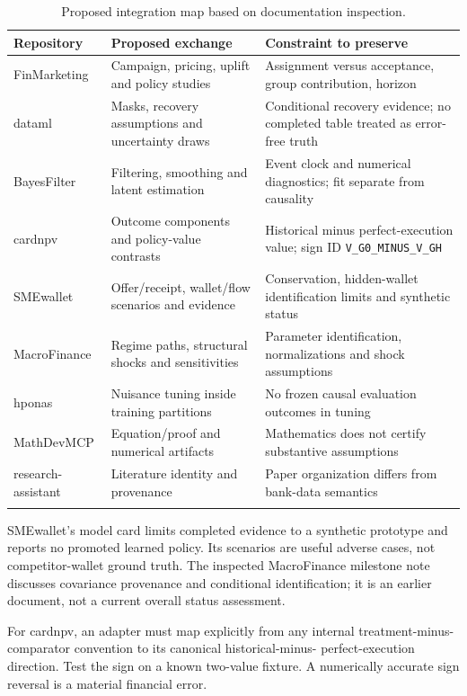 \begin{longtable}{P{24mm}P{50mm}P{68mm}}
\toprule Repository & Proposed exchange & Constraint to preserve\\\midrule
\endhead
FinMarketing & Campaign, pricing, uplift and policy studies & Assignment versus acceptance, group contribution, horizon\\
dataml & Masks, recovery assumptions and uncertainty draws & Conditional recovery evidence; no completed table treated as error-free truth\\
BayesFilter & Filtering, smoothing and latent estimation & Event clock and numerical diagnostics; fit separate from causality\\
cardnpv & Outcome components and policy-value contrasts & Historical minus perfect-execution value; sign ID \texttt{V\_G0\_MINUS\_V\_GH}\\
SMEwallet & Offer/receipt, wallet/flow scenarios and evidence & Conservation, hidden-wallet identification limits and synthetic status\\
MacroFinance & Regime paths, structural shocks and sensitivities & Parameter identification, normalizations and shock assumptions\\
hponas & Nuisance tuning inside training partitions & No frozen causal evaluation outcomes in tuning\\
MathDev\-MCP & Equation/proof and numerical artifacts & Mathematics does not certify substantive assumptions\\
research-assistant & Literature identity and provenance & Paper organization differs from bank-data semantics\\
\bottomrule
\caption{Proposed integration map based on documentation inspection.}
\label{tab:repos}
\end{longtable}

SMEwallet's model card limits completed evidence to a synthetic prototype
and reports no promoted learned policy. Its scenarios are useful adverse
cases, not competitor-wallet ground truth. The inspected MacroFinance
milestone note discusses covariance provenance and conditional identification;
it is an earlier document, not a current overall status assessment.

For cardnpv, an adapter must map explicitly from any internal
treatment-minus-comparator convention to its canonical historical-minus-
perfect-execution direction. Test the sign on a known two-value fixture.
A numerically accurate sign reversal is a material financial error.


